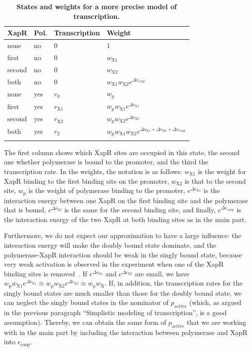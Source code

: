 \documentclass[10pt,letterpaper]{article}
\newlength\savedwidth
\newcommand\thickhline{\noalign{\global\savedwidth\arrayrulewidth\global\arrayrulewidth 2pt}%
	\hline
	\noalign{\global\arrayrulewidth\savedwidth}}
\newcommand{\n}[1]{\mathrm{#1}}
\begin{document}
\begin{table}
	\centering
	\caption{
		{\bf States and weights for a more precise model of transcription.}}
	\begin{tabular}{llll}
		\thickhline
		XapR & Pol. & Transcription & Weight \\
		\hline
		none & no & $0$ & $1$ \\
		first & no & $0$ & $w_{\n{X1}}$ \\
		second & no & $0$ & $w_{\n{X2}}$ \\
		both & no & $0$ & $w_{\n{X1}} w_{\n{X2}} e^{\Delta \epsilon_{\n{coop}}}$ \\
		none & yes & $r_0$ & $w_{\n{p}}$ \\
		first & yes & $r_{\n{X1}}$ & $w_{\n{p}} w_{\n{X1}} e^{\Delta \epsilon_{\n{X1}}}$ \\
		second & yes & $r_{\n{X2}}$ & $w_{\n{p}} w_{\n{X2}} e^{\Delta \epsilon_{\n{X2}}}$ \\
		both & yes & $r_2$ & $w_{\n{p}} w_{\n{X1}} w_{\n{X2}} e^{\Delta \epsilon_{\n{X1}} + \Delta \epsilon_{\n{X2}} + \Delta \epsilon_{\n{coop}}}$ \\
		\thickhline
	\end{tabular}
	\begin{flushleft} 
		The first column shows which XapR sites are occupied in this state, the second one whether polymerase is bound to the promoter, and the third the transcription rate. In the weights, the notation is as follows: $w_{\n{X1}}$ is the weight for XapR binding to the first binding site on the promoter, $w_{\n{X2}}$ is that to the second site, $w_{\n{p}}$ is the weight of polymerase binding to the promoter, $e^{\Delta \epsilon_{\n{X1}}}$ is the interaction energy between one XapR on the first binding site and the polymerase that is bound, $e^{\Delta \epsilon_{\n{X2}}}$ is the same for the second binding site, and finally, $e^{\Delta \epsilon_{\n{coop}}}$ is the interaction energy of the two XapR at both binding sites as in the main part.
	\end{flushleft}
	\label{tableSI1:statesPromoter}
\end{table}

Furthermore, we do not expect our approximation to have a large influence: the interaction energy will make the doubly bound state dominate, and the polymerase-XapR interaction should be weak in the singly bound state, because very weak activation is observed in the experiment when one of the XapR binding sites is removed~\cite{Chure2019}. If $e^{\Delta \epsilon_{\n{X1}}}$ and $e^{\Delta \epsilon_{\n{X2}}}$ are small, we have $w_{\n{p}} w_{\n{X1}} e^{\Delta \epsilon_{\n{X1}}} \approx w_{\n{p}} w_{\n{X2}} e^{\Delta \epsilon_{\n{X2}}} \approx w_{\n{p}} w_{\n{X}}$. If, in addition, the transcription rates for the singly bound states are much smaller than those for the doubly bound state, we can neglect the singly bound states in the nominator of $p_{\n{active}}$ (which, as argued in the previous paragraph ``Simplistic modeling of transcription'', is a good assumption). Thereby, we can obtain the same form of $p_{\n{active}}$ that we are working with in the main part by including the interaction between polymerase and XapR into $\epsilon_{\n{coop}}$.
\end{document}
